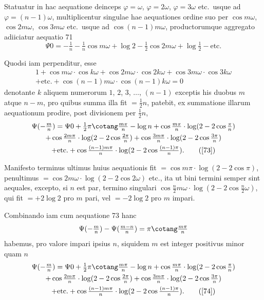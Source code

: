 \documentclass[12pt,a4paper]{article}
\begin{document}
Statuatur in hac aequatione deinceps $\varphi=\omega$, $\varphi=2\omega$, $\varphi=3\omega$ etc.\ usque ad $\varphi=(n-1)\omega$, multiplicentur singulae hae aequationes ordine suo per $\cos m\omega$, $\cos2m\omega$, $\cos3m\omega$ etc.\ usque ad $\cos(n-1)m\omega$, productorumque aggregato adiiciatur aequatio 71
\[
\Psi0 = -\tfrac{1}{n} - \tfrac{1}{n}\cos m\omega + \log2 - \tfrac{1}{2}\cos2m\omega + \log\tfrac{1}{2} - \text{etc.}
\]

Quodsi iam perpenditur, esse
\begin{multline*}
1 + \cos m\omega\cdot\cos k\omega + \cos2m\omega\cdot\cos2k\omega + \cos3m\omega\cdot\cos3k\omega\\
+ \text{etc.} + \cos(n-1)m\omega\cdot\cos(n-1)k\omega = 0
\end{multline*}
denotante $k$ aliquem numerorum $1$, $2$, $3$, $\ldots$, $(n-1)$ exceptis his duobus $m$ atque $n-m$, pro quibus summa illa fit $=\frac{1}{2}n$, patebit, ex summatione illarum aequationum prodire, post divisionem per $\frac{1}{2}n$,
\begin{multline}
\Psi(-\tfrac{m}{n}) = \Psi0 + \tfrac{1}{2}\pi\cotang\tfrac{m\pi}{n} - \log n + \cos\tfrac{m\pi}{n}\cdot\log(2-2\cos\tfrac{\pi}{n})\\
+ \cos\tfrac{2m\pi}{n}\cdot\log(2-2\cos\tfrac{2\pi}{n}) + \cos\tfrac{3m\pi}{n}\cdot\log(2-2\cos\tfrac{3\pi}{n})\\
+ \text{etc.} + \cos\tfrac{(n-1)m\pi}{n}\cdot\log(2-2\cos\tfrac{(n-1)\pi}{n}).\tag{[73]}
\end{multline}

Manifesto terminus ultimus huius aequationis fit $=\cos m\pi\cdot\log(2-2\cos\pi)$, penultimus $=\cos2m\omega\cdot\log(2-2\cos2\omega)$ etc., ita ut bini termini semper sint aequales, excepto, si $n$ est par, termino singulari $\cos\frac{n}{2}m\omega\cdot\log(2-2\cos\frac{n}{2}\omega)$, qui fit $=+2\log2$ pro $m$ pari, vel $=-2\log2$ pro $m$ impari.

Combinando iam cum aequatione 73 hanc
\[
\Psi(-\tfrac{m}{n}) - \Psi(\tfrac{m-n}{n}) = \pi\cotang\tfrac{m\pi}{n}
\]
habemus, pro valore impari ipsius $n$, siquidem $m$ est integer positivus minor quam $n$
\begin{multline}
\Psi(-\tfrac{m}{n}) = \Psi0 + \tfrac{1}{2}\pi\cotang\tfrac{m\pi}{n} - \log n + \cos\tfrac{m\pi}{n}\cdot\log(2-2\cos\tfrac{\pi}{n})\\
+ \cos\tfrac{2m\pi}{n}\cdot\log(2-2\cos\tfrac{2\pi}{n}) + \cos\tfrac{3m\pi}{n}\cdot\log(2-2\cos\tfrac{3\pi}{n})\\
+ \text{etc.} + \cos\tfrac{(n-1)m\pi}{n}\cdot\log(2-2\cos\tfrac{(n-1)\pi}{n}).\tag{[74]}
\end{multline}
\end{document}
